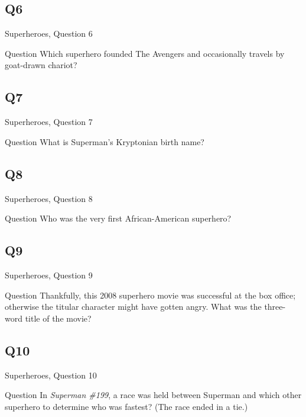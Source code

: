 \documentclass[11pt]{beamer}
\begin{document}
\subsection*{Q6}
\begin{frame}[t]{Superheroes, Question 6}
\begin{block}{Question}
Which superhero founded The Avengers and occasionally travels by goat-drawn chariot?
\end{block}
\end{frame}
\subsection*{Q7}
\begin{frame}[t]{Superheroes, Question 7}
\begin{block}{Question}
What is Superman's Kryptonian birth name?
\end{block}
\end{frame}
\subsection*{Q8}
\begin{frame}[t]{Superheroes, Question 8}
\begin{block}{Question}
Who was the very first African-American superhero?
\end{block}
\end{frame}
\subsection*{Q9}
\begin{frame}[t]{Superheroes, Question 9}
\begin{block}{Question}
Thankfully, this 2008 superhero movie was successful at the box office; otherwise the titular character might have gotten angry.  What was the three-word title of the movie?
\end{block}
\end{frame}
\subsection*{Q10}
\begin{frame}[t]{Superheroes, Question 10}
\begin{block}{Question}
In \emph{Superman \#199}, a race was held between Superman and which other superhero to determine who was fastest? (The race ended in a tie.)
\end{block}
\end{frame}
\end{document}
